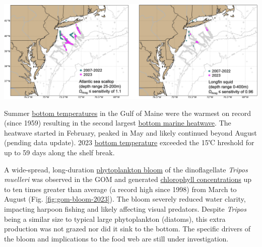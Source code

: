 \documentclass[
  10pt,
]{article}
\let\origfigure\figure
\let\endorigfigure\endfigure
\renewenvironment{figure}[1][2] {
    \expandafter\origfigure\expandafter[H]
} {
    \endorigfigure
}
\begin{document}
\begin{figure}

{\centering \includegraphics[width=1\linewidth]{images/Figure6_GraceSaba_2024} 

}

\caption{Left: Mission tracks of three gliders deployed off the coast of New Jersey in August and September of 2023. Right: Locations of hypoxic levels of dissolved oxygen (magenta; < 3 mg/liter) and low aragonite saturation state (cyan; < 1) measured along the glider mission tracks and locations of reported fish, lobster, and/or crab mortalities (red X).}\label{fig:hypoxia-2023}
\end{figure}

Summer \href{https://noaa-edab.github.io/catalog/bottom_temp_comp.html}{bottom temperatures} in the Gulf of Maine were the warmest on record (since 1959) resulting in the second largest \href{https://noaa-edab.github.io/catalog/heatwave_year.html}{bottom marine heatwave}. The heatwave started in February, peaked in May and likely continued beyond August (pending data update). 2023 \href{https://noaa-edab.github.io/catalog/thermal_habitat_persistence.html}{bottom temperature} exceeded the 15℃ hreshold for up to 59 days along the shelf break.

A wide-spread, long-duration \href{https://noaa-edab.github.io/catalog/observation_synthesis.html}{phytoplankton bloom} of the dinoflagellate \emph{Tripos muelleri} was observed in the GOM and generated \href{https://noaa-edab.github.io/catalog/chl_pp.html}{chlorophyll concentrations} up to ten times greater than average (a record high since 1998) from March to August (Fig. \ref{fig:gom-bloom-2023}). The bloom severely reduced water clarity, impacting harpoon fishing and likely affecting visual predators. Despite \emph{Tripos} being a similar size to typical large phytoplankton (diatoms), this extra production was not grazed nor did it sink to the bottom. The specific drivers of the bloom and implications to the food web are still under investigation.
\end{document}
